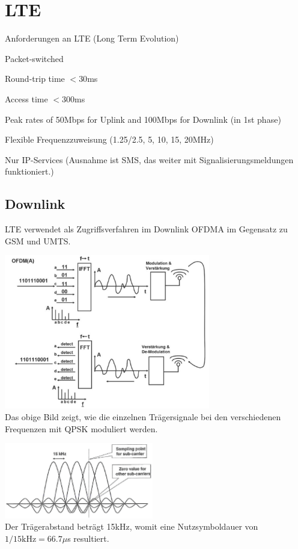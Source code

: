 \section{LTE }
    Anforderungen an LTE (Long Term Evolution)
	\begin{liste}
        \item Packet-switched
        \item Round-trip time $< 30$ms
        \item Access time $< 300$ms
        \item Peak rates of 50Mbps for Uplink and 100Mbps for Downlink (in 1st phase)
        \item Flexible Frequenzzuweisung (1.25/2.5, 5, 10, 15, 20MHz)
		\item Nur IP-Services (Ausnahme ist SMS, das weiter mit Signalisierungsmeldungen funktioniert.)
    \end{liste}

\subsection{Downlink}
	LTE verwendet als Zugriffsverfahren im Downlink OFDMA im Gegensatz zu GSM und UMTS.

	\begin{minipage}{9cm}        
        \includegraphics[width=9cm]{./bilder/systems-lte-ofdma.png} \\
        Das obige Bild zeigt, wie die einzelnen Trägersignale bei den verschiedenen Frequenzen mit QPSK moduliert werden.
    \end{minipage}
	\begin{minipage}{0.5cm}        
        \quad
    \end{minipage}
    \begin{minipage}{6.5cm}
		\includegraphics[width=6.5cm]{./bilder/systems-lte-qpsk.png} \\
		Der Trägerabstand beträgt 15kHz, womit eine Nutzsymboldauer von $1/15\text{kHz}=66.7\mu$s resultiert.
	\end{minipage}
	
	
	
